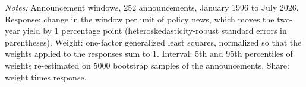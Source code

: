 \begin{table}[tbp]\centering\small
\caption{Market Index: Responses to Policy News and Weights}\label{tab:weights}
\begin{flushleft}\footnotesize\textit{Notes:} Announcement windows, 252 announcements, January 1996 to July 2026. Response: change in the window per unit of policy news, which moves the two-year yield by 1 percentage point (heteroskedasticity-robust standard errors in parentheses). Weight: one-factor generalized least squares, normalized so that the weights applied to the responses sum to 1. Interval: 5th and 95th percentiles of weights re-estimated on 5000 bootstrap samples of the announcements. Share: weight times response.\end{flushleft}
\end{table}
